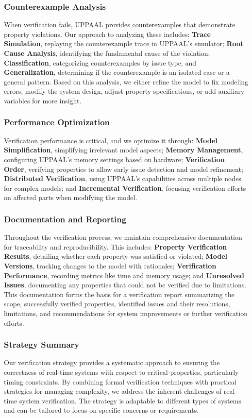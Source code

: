 \subsubsection{Counterexample Analysis}
When verification fails, UPPAAL provides counterexamples that demonstrate property violations. Our approach to analyzing these includes: \textbf{Trace Simulation}, replaying the counterexample trace in UPPAAL's simulator; \textbf{Root Cause Analysis}, identifying the fundamental cause of the violation; \textbf{Classification}, categorizing counterexamples by issue type; and \textbf{Generalization}, determining if the counterexample is an isolated case or a general pattern. Based on this analysis, we either refine the model to fix modeling errors, modify the system design, adjust property specifications, or add auxiliary variables for more insight.

\subsubsection{Performance Optimization}
Verification performance is critical, and we optimize it through: \textbf{Model Simplification}, simplifying irrelevant model aspects; \textbf{Memory Management}, configuring UPPAAL's memory settings based on hardware; \textbf{Verification Order}, verifying properties to allow early issue detection and model refinement; \textbf{Distributed Verification}, using UPPAAL's capabilities across multiple nodes for complex models; and \textbf{Incremental Verification}, focusing verification efforts on affected parts when modifying the model.

\subsubsection{Documentation and Reporting}
Throughout the verification process, we maintain comprehensive documentation for traceability and reproducibility. This includes: \textbf{Property Verification Results}, detailing whether each property was satisfied or violated; \textbf{Model Versions}, tracking changes to the model with rationales; \textbf{Verification Performance}, recording metrics like time and memory usage; and \textbf{Unresolved Issues}, documenting any properties that could not be verified due to limitations. This documentation forms the basis for a verification report summarizing the scope, successfully verified properties, identified issues and their resolutions, limitations, and recommendations for system improvements or further verification efforts.

\subsubsection{Strategy Summary}
Our verification strategy provides a systematic approach to ensuring the correctness of real-time systems with respect to critical properties, particularly timing constraints. By combining formal verification techniques with practical strategies for managing complexity, we address the inherent challenges of real-time system verification. The strategy is adaptable to different types of systems and can be tailored to focus on specific concerns or requirements.